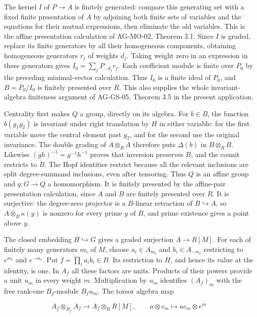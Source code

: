 \documentclass[11pt,a4paper,openany]{report}
\begin{document}
The kernel \(I\) of \(P\to A\) is finitely generated: compare this generating set with a fixed finite presentation of \(A\) by adjoining both finite sets of variables and the equations for their mutual expressions, then eliminate the old variables. This is the affine presentation calculation of AG-MO-02, Theorem 3.1. Since \(I\) is graded, replace its finite generators by all their homogeneous components, obtaining homogeneous generators \(r_j\) of weights \(d_j\). Taking weight zero in an expression in these generators gives \(I_0=\sum_j P_{-d_j}r_j\). Each coefficient module is finite over \(P_0\) by the preceding minimal-vector calculation. Thus \(I_0\) is a finite ideal of \(P_0\), and \(B=P_0/I_0\) is finitely presented over \(R\). This also supplies the whole invariant-algebra finiteness argument of AG-GS-05, Theorem 3.5 in the present application.

Centrality first makes \(Q\) a group, directly on its algebra. For \(b\in B\), the function \(b(g_1g_2)\) is invariant under right translation by \(H\) in either variable: for the first variable move the central element past \(g_2\), and for the second use the original invariance. The double grading of \(A\otimes_R A\) therefore puts \(\Delta(b)\) in \(B\otimes_R B\). Likewise \((gh)^{-1}=g^{-1}h^{-1}\) proves that inversion preserves \(B\), and the counit restricts to \(B\). The Hopf identities restrict because all the relevant inclusions are split degree-summand inclusions, even after tensoring. Thus \(Q\) is an affine group and \(q:G\to Q\) a homomorphism. It is finitely presented by the affine-pair presentation calculation, since \(A\) and \(B\) are finitely presented over \(R\). It is surjective: the degree-zero projector is a \(B\)-linear retraction of \(B\hookrightarrow A\), so \(A\otimes_B\kappa(y)\) is nonzero for every prime \(y\) of \(B\), and prime existence gives a point above \(y\).

The closed embedding \(H\hookrightarrow G\) gives a graded surjection \(A\to R[M]\). For each of finitely many generators \(m_i\) of \(M\), choose \(a_i\in A_{m_i}\) and \(b_i\in A_{-m_i}\) restricting to \(e^{m_i}\) and \(e^{-m_i}\). Put \(f=\prod_i a_i b_i\in B\). Its restriction to \(H\), and hence its value at the identity, is one. In \(A_f\) all these factors are units. Products of their powers provide a unit \(u_m\) in every weight \(m\). Multiplication by \(u_m\) identifies \((A_f)_m\) with the free rank-one \(B_f\)-module \(B_f u_m\). The torsor algebra map

\[
A_f\otimes_{B_f}A_f\longrightarrow A_f\otimes_R R[M],
\qquad a\otimes c_m\longmapsto ac_m\otimes e^m
\]
\end{document}
